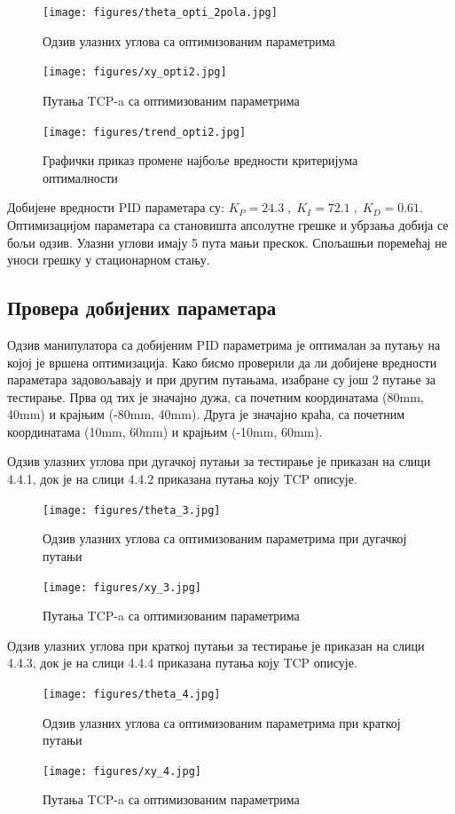 \documentclass[12pt]{article}
\begin{document}
\begin{figure}[H]
    \centering
    \texttt{[image: figures/theta\_opti\_2pola.jpg]}
    \caption{Одзив улазних углова са оптимизованим параметрима}
    \label{fig:theta2}
\end{figure}
\begin{figure}[H]
    \centering
    \texttt{[image: figures/xy\_opti2.jpg]}
    \caption{Путања TCP-a са оптимизованим параметрима}
    \label{fig:xy2}
\end{figure}
\begin{figure}[H]
    \centering
    \texttt{[image: figures/trend\_opti2.jpg]}
    \caption{Графички приказ промене најбоље вредности критеријума оптималности}
    \label{fig:trend_2}
\end{figure}
Добијене вредности PID параметара су: $K_P=24.3\;,\;K_I=72.1\;,\;K_D=0.61$. Оптимизацијом параметара са становишта апсолутне грешке и убрзања добија се бољи одзив. Улазни углови имају 5 пута мањи прескок. Спољашњи поремећај не уноси грешку у стационарном стању.

\subsection{Провера добијених параметара}
Одзив манипулатора са добијеним PID параметрима је оптималан за путању на којој је вршена оптимизација.
Како бисмо проверили да ли добијене вредности параметара задовољавају и при другим путањама, изабране су још 2 путање за тестирање. Прва од тих је значајно дужа, са почетним координатама (80mm, 40mm) и крајњим (-80mm, 40mm). Друга је значајно краћа, са почетним координатама (10mm, 60mm) и крајњим (-10mm, 60mm).

Одзив улазних углова при дугачкој путањи за тестирање је приказан на слици 4.4.1, док је на слици 4.4.2 приказана путања коју TCP описује.
\begin{figure}[H]
    \centering
    \texttt{[image: figures/theta\_3.jpg]}
    \caption{Одзив улазних углова са оптимизованим параметрима при дугачкој путањи}
    \label{fig:theta3}
\end{figure}
\begin{figure}[H]
    \centering
    \texttt{[image: figures/xy\_3.jpg]}
    \caption{Путања TCP-a са оптимизованим параметрима}
    \label{fig:xy_3}
\end{figure}
Одзив улазних углова при краткој путањи за тестирање је приказан на слици 4.4.3, док је на слици 4.4.4 приказана путања коју TCP описује.
\begin{figure}[H]
    \centering
    \texttt{[image: figures/theta\_4.jpg]}
    \caption{Одзив улазних углова са оптимизованим параметрима при краткој путањи}
    \label{fig:theta_short}
\end{figure}
\begin{figure}[H]
    \centering
    \texttt{[image: figures/xy\_4.jpg]}
    \caption{Путања TCP-a са оптимизованим параметрима}
    \label{fig:xy_short}
\end{figure}
\end{document}
